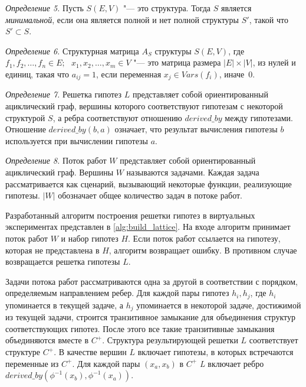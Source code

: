 \textit{Определение 5.} Пусть $S\left( E, V\right)$ "--- это структура. Тогда $S$ является \textit{минимальной}, 
если она является полной и нет полной структуры $S'$, такой что $S' \subset S$.

\textit{Определение 6.} Структурная матрица $A_S$ структуры $S\left( E, V\right)$, где $f_1, f_2, \ldots, f_n \in E;
\text{ } x_1, x_2, \ldots, x_m \in V$ "--- это матрица размера $|E| \times |V|$, из нулей и единиц, такая что 
$a_{ij} = 1$, если переменная $x_j \in Vars(f_i)$, иначе~$0$.

\textit{Определение 7.} Решетка гипотез $L$ представляет собой ориентированный ациклический граф, вершины которого 
соответствуют гипотезам с некоторой структурой $S$, а ребра соответствуют отношению $derived\_by$  между гипотезами. 
Отношение $derived\_ by\left(b, a\right)$ означает, что результат вычисления гипотезы $b$ используется при вычислении 
гипотезы $a$.

\textit{Определение 8.} Поток работ $W$ представляет собой ориентированный ациклический граф. Вершины $W$ называются 
задачами. Каждая задача рассматривается как сценарий, вызывающий некоторые функции, реализующие гипотезы. $|W|$ 
обозначает общее количество задач в потоке работ.

Разработанный алгоритм построения решетки гипотез в виртуальных экспериментах представлен в 
\cref{alg:build_lattice}. На входе алгоритм принимает поток работ $W$ и набор гипотез $H$. 
Если поток работ ссылается на гипотезу, которая не представлена в $H$, алгоритм возвращает ошибку. 
В противном случае возвращается решетка гипотезы $L$.  

Задачи потока работ рассматриваются одна за другой в соответствии с порядком, определяемым направлением ребер. 
Для каждой пары гипотез $h_i, h_j$, где $h_i$ упоминается в текущей задаче, а $h_j$ упоминается в некоторой задаче, 
достижимой из текущей задачи, строится транзитивное замыкание для объединения структур соответствующих гипотез. 
После этого все такие транзитивные замыкания объединяются вместе в $C^+$. Структура результирующей решетки $L$ 
соответствует структуре $C^+$. В качестве вершин $L$ включает гипотезы, в которых встречаются переменные из $C^+$. 
Для каждой пары $\left(x_a, x_b\right)$ в $C^+$ \textit{L} включает ребро 
$derived\_by \left(\phi^{-1}\left(x_b\right), \phi^{-1}\left(x_a\right)\right)$.

